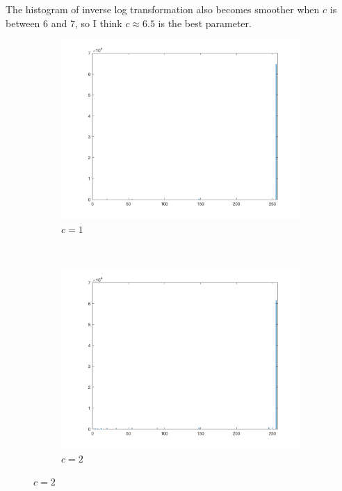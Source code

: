 \documentclass{article}
\begin{document}
\begin{enumerate}[label=(\alph*)]
    \newpage
    The histogram of inverse log transformation also becomes smoother when $c$ is between $6$ and $7$, so I think $c \approx 6.5$ is the best parameter.
    \begin{figure}[!htb]
        \centering
        \begin{subfigure}[b]{0.3\textwidth}
            \includegraphics[width=\textwidth]{img/hist_ILT1.png}
            \caption{$c = 1$}
        \end{subfigure}
        ~
        \begin{subfigure}[b]{0.3\textwidth}
            \includegraphics[width=\textwidth]{img/hist_ILT2.png}
            \caption{$c = 2$}
        \end{subfigure}

\end{figure}
\end{enumerate}
\end{document}
